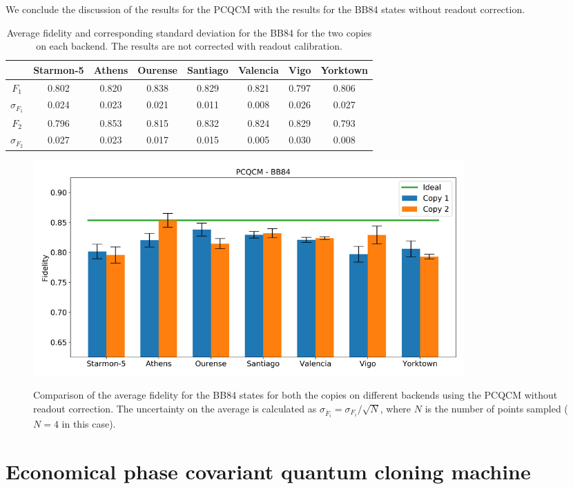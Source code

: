 We conclude the discussion of the results for the PCQCM with the results for the BB84 states without readout correction.
\begin{table}[H]
    \centering
    \begin{tabular}{|c|c|c|c|c|c|c|c|}
    \hline
    \textbf{} & \textbf{Starmon-5} & \textbf{Athens} & \textbf{Ourense} & \textbf{Santiago} & \textbf{Valencia} & \textbf{Vigo} & \textbf{Yorktown} \\ \hline
    $F_1$              & 0.802 & 0.820 & 0.838 & 0.829 & 0.821 & 0.797 & 0.806 \\ \hline
    $\sigma_{F_1}$     & 0.024 & 0.023 & 0.021 & 0.011 & 0.008 & 0.026 & 0.027 \\ \hline
    $F_2$              & 0.796 & 0.853 & 0.815 & 0.832 & 0.824 & 0.829 & 0.793 \\ \hline
    $\sigma_{F_2}$     & 0.027 & 0.023 & 0.017 & 0.015 & 0.005 & 0.030 & 0.008 \\ \hline
    \end{tabular}
    \caption{Average fidelity and corresponding standard deviation for the BB84 for the two copies on each backend. The results are not corrected with readout calibration.}
    \label{tab:results_pcqcm_bb84_not_corrected}
\end{table}
\begin{figure}[H]
  \centering
          \includegraphics[width=0.8\textwidth]{Figures/PhaseCovariant/Histograms/histo_bb84.png}
      \label{fig:pc_histo_bb84_corrected}
      \caption{Comparison of the average fidelity for the BB84 states for both the copies on different backends using the PCQCM without readout correction. The uncertainty on the average is calculated as $\sigma_{\overline{F}_i}=\sigma_{F_i}/\sqrt{N}$, where $N$ is the number of points sampled ($N=4$ in this case).}
\end{figure}


\section{Economical phase covariant quantum cloning machine}
